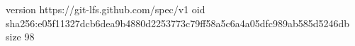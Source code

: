 version https://git-lfs.github.com/spec/v1
oid sha256:e05f11327dcb6dea9b4880d2253773c79ff58a5c6a4a05dfc989ab585d5246db
size 98
